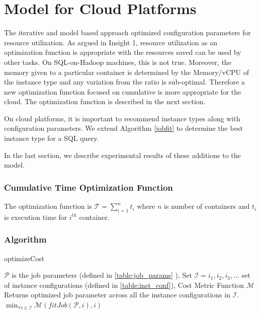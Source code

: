 \section{Model for Cloud Platforms}
\label{sec:modelcloud}
The iterative and model based approach optimized configuration parameters for resource utilization. As argued in Insight 1, 
resource utilization as an optimization function is appropriate with the resources saved can be used by other tasks. On SQL-on-Hadoop
machines, this is not true. Moreover, the memory given to a particular container is determined by the Memory/vCPU of the instance type 
and any variation from the ratio is sub-optimal. Therefore a new optimization function focused on cumulative is more appropriate for the cloud.
The optimization function is described in the next section.

On cloud platforms, it is important to recommend instance types along with configuration parameters. We extend Algorithm \ref{jobfit} to determine
the best instance type for a SQL query.

In the last section, we describe experimental results of these additions to the model.

\noindent\subsubsection*{Cumulative Time Optimization Function}
\label{subsubsec:cumulative_time}
The optimization function is 
$\mathcal{T} = \sum_{i=1}^{n} t_i$ where $n$ is number of containers and $t_i$ is execution time for $i^{th}$ container. 

\noindent\subsubsection*{Algorithm}

\begin{algorithm}
\caption{optimizeCost} \label{cost_optimize}
\begin{algorithmic}[1]
\footnotesize
\REQUIRE $\mathcal{P}$ is the job parameters (defined in \ref{table:job_params} ), Set $\mathcal{I} = {i_1, i_2, i_3, ...} $ set of instance configurations (defined in \ref{table:inst_conf}), Cost Metric Function $\mathcal{M}$
\ENSURE Returns optimized job parameter across all the instance configurations in $\mathcal{I}$.
\RETURN $\min_{\forall i \in \mathcal{I}} \mathcal{M}(fitJob(\mathcal{P}, i), i)$
\end{algorithmic}
\end{algorithm}

